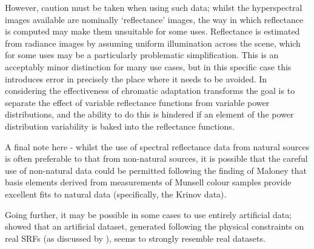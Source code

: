 However, caution must be taken when using such data; whilst the hyperspectral images available are nominally `reflectance' images, the way in which reflectance is computed may make them unsuitable for some uses. Reflectance is estimated from radiance images by assuming uniform illumination across the scene, which for some uses may be a particularly problematic simplification. This is an acceptably minor distinction for many use cases, but in this specific case this introduces error in precisely the place where it needs to be avoided. In considering the effectiveness of chromatic adaptation transforms the goal is to separate the effect of variable reflectance functions from variable power distributions, and the ability to do this is hindered if an element of the power distribution variability is baked into the reflectance functions.


A final note here - whilst the use of spectral reflectance data from natural sources is often preferable to that from non-natural sources, it is possible that the careful use of non-natural data could be permitted following the finding of Maloney \cite{maloney_evaluation_1986} that basis elements derived from measurements of Munsell colour samples provide excellent fits to natural data (specifically, the Krinov data).

Going further, it may be possible in some cases to use entirely artificial data; \citet{chen_physical_2005} showed that an artificial dataset, generated following the physical constraints on real \glspl{SRF} (as discussed by \citet{nassau_physics_2001}), seems to strongly resemble real datasets.